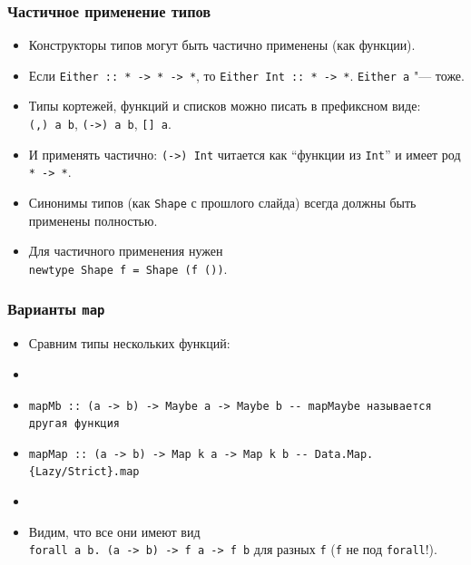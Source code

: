 \documentclass[11pt]{beamer}
\begin{document}
\begin{frame}[fragile]
\frametitle{Частичное применение типов}
\begin{itemize}
    \item Конструкторы типов могут быть частично применены (как функции).
    \item Если \lstinline!Either :: * -> * -> *!, то \lstinline|Either Int|\pause\lstinline| :: * -> *|. \lstinline|Either a| "--- тоже.
    \pause
    \item Типы кортежей, функций и списков можно писать в префиксном виде: \\
    \lstinline|(,) a b|, \lstinline|(->) a b|, \lstinline|[] a|.
    \pause
    \item И применять частично: \lstinline|(->) Int| читается как \enquote{функции из \lstinline|Int|} и имеет род \pause\lstinline|* -> *|.
    \pause
    \item Синонимы типов (как \lstinline|Shape| с прошлого слайда) всегда должны быть применены полностью.
    \pause
    \item Для частичного применения нужен \\
    \lstinline|newtype Shape f = Shape (f ())|.
\end{itemize}
\end{frame}

\begin{frame}[fragile]
\frametitle{Варианты \lstinline|map|}
\begin{itemize}
    \item Сравним типы нескольких функций:
    \item {}
    \pause
    \item \lstinline|mapMb :: (a -> b) -> Maybe a -> Maybe b -- mapMaybe называется другая функция|
    \pause
    \item \lstinline|mapMap :: (a -> b) -> Map k a -> Map k b -- Data.Map.{Lazy/Strict}.map|
    \pause
    \item {} \pause
    \item Видим, что все они имеют вид \pause \\
    \lstinline|forall a b. (a -> b) -> f a -> f b| для разных \lstinline|f| (\lstinline|f| не под \lstinline|forall|!).
\end{itemize}
\end{frame}
\end{document}
